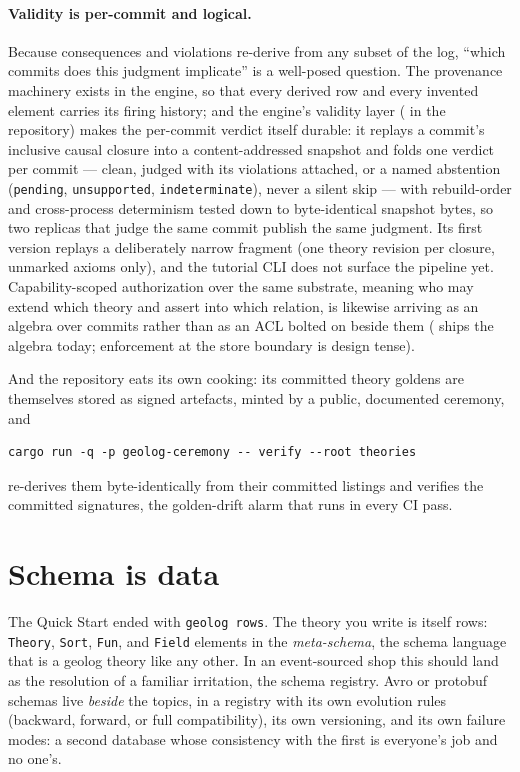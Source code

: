 \paragraph{Validity is per-commit and logical.} Because consequences
and violations re-derive from any subset of the log, ``which commits
does this judgment implicate'' is a well-posed question. The
provenance machinery exists in the engine, so that every derived row
and every invented element carries its firing history; and the
engine's validity layer ( in the
repository) makes the per-commit verdict itself durable: it replays a
commit's inclusive causal closure into a content-addressed snapshot
and folds one verdict per commit --- clean, judged with its
violations attached, or a named abstention (\texttt{pending},
\texttt{unsupported}, \texttt{indeterminate}), never a silent skip
--- with rebuild-order and cross-process determinism tested down to
byte-identical snapshot bytes, so two replicas that judge the same
commit publish the same judgment. Its first version replays a
deliberately narrow fragment (one theory revision per closure,
unmarked axioms only), and the tutorial CLI does not surface the
pipeline yet.
Capability-scoped authorization over the same substrate, meaning who
may extend which theory and assert into which relation, is likewise
arriving as an algebra over commits rather than as an ACL bolted on
beside them ( ships the algebra today; enforcement
at the store boundary is design tense).

And the repository eats its own cooking: its committed theory
goldens are themselves stored as signed artefacts, minted by a
public, documented ceremony, and

\begin{Verbatim}[fontsize=\small,frame=leftline,rulecolor=\color{accentmid},framesep=3mm,xleftmargin=3mm]
cargo run -q -p geolog-ceremony -- verify --root theories
\end{Verbatim}

\noindent re-derives them byte-identically from their committed
listings and verifies the committed signatures, the golden-drift alarm
that runs in every CI pass.

\section{Schema is data}
\label{sec:gt-schema}

The Quick Start ended with \texttt{geolog rows}. The theory you write
is itself rows: \texttt{Theory}, \texttt{Sort}, \texttt{Fun}, and
\texttt{Field} elements in the \emph{meta-schema}, the schema language
that is a geolog theory like any other. In an event-sourced shop this
should land as the resolution of a familiar irritation, the schema
registry. Avro or protobuf schemas live \emph{beside} the topics, in a
registry with its own evolution rules (backward, forward, or full
compatibility), its own versioning, and its own failure modes: a
second database whose consistency with the first is everyone's job and
no one's.


